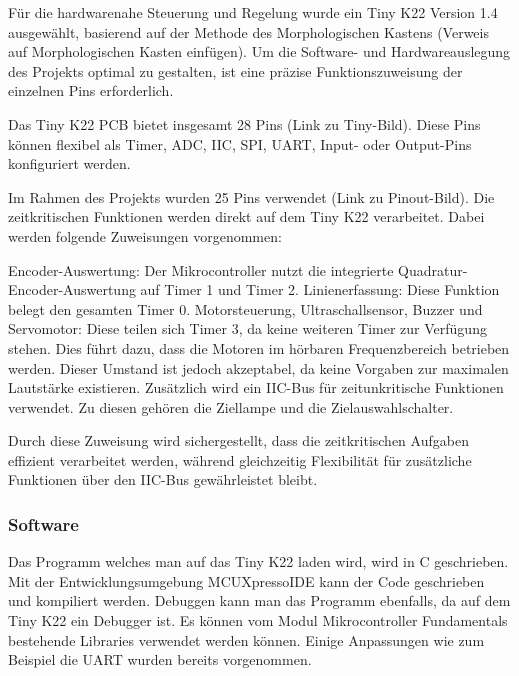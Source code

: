 Für die hardwarenahe Steuerung und Regelung wurde ein Tiny K22 Version 1.4 ausgewählt, basierend auf der Methode des Morphologischen Kastens (Verweis auf Morphologischen Kasten einfügen). Um die Software- und Hardwareauslegung des Projekts optimal zu gestalten, ist eine präzise Funktionszuweisung der einzelnen Pins erforderlich.

Das Tiny K22 PCB bietet insgesamt 28 Pins (Link zu Tiny-Bild). Diese Pins können flexibel als Timer, ADC, IIC, SPI, UART, Input- oder Output-Pins konfiguriert werden.

Im Rahmen des Projekts wurden 25 Pins verwendet (Link zu Pinout-Bild). Die zeitkritischen Funktionen werden direkt auf dem Tiny K22 verarbeitet. Dabei werden folgende Zuweisungen vorgenommen:

Encoder-Auswertung: Der Mikrocontroller nutzt die integrierte Quadratur-Encoder-Auswertung auf Timer 1 und Timer 2.
Linienerfassung: Diese Funktion belegt den gesamten Timer 0.
Motorsteuerung, Ultraschallsensor, Buzzer und Servomotor: Diese teilen sich Timer 3, da keine weiteren Timer zur Verfügung stehen. Dies führt dazu, dass die Motoren im hörbaren Frequenzbereich betrieben werden. Dieser Umstand ist jedoch akzeptabel, da keine Vorgaben zur maximalen Lautstärke existieren.
Zusätzlich wird ein IIC-Bus für zeitunkritische Funktionen verwendet. Zu diesen gehören die Ziellampe und die Zielauswahlschalter.

Durch diese Zuweisung wird sichergestellt, dass die zeitkritischen Aufgaben effizient verarbeitet werden, während gleichzeitig Flexibilität für zusätzliche Funktionen über den IIC-Bus gewährleistet bleibt.




\subsubsection{Software}

Das Programm welches man auf das Tiny K22 laden wird, wird in C geschrieben. Mit der Entwicklungsumgebung MCUXpressoIDE kann der Code geschrieben und kompiliert werden. Debuggen kann man das Programm ebenfalls, da auf dem Tiny K22 ein Debugger ist. Es können vom Modul Mikrocontroller Fundamentals bestehende Libraries verwendet werden können. Einige Anpassungen wie zum Beispiel die UART wurden bereits vorgenommen.



